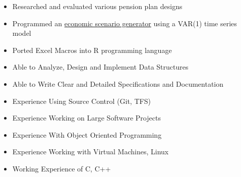 \documentclass[12pt,a4paper]{altacv}
\begin{document}

\divider

\begin{itemize}
\item Researched and evaluated various pension plan designs
\item Programmed an \href{https://github.com/nathanesau/StocVal}{economic scenario generator} using a VAR(1) time series model
\item Ported Excel Macros into R programming language
\end{itemize}

\divider



\begin{itemize}
\item Able to Analyze, Design and Implement Data Structures
\item Able to Write Clear and Detailed Specifications and Documentation
\item Experience Using Source Control (Git, TFS)
\item Experience Working on Large Software Projects
\item Experience With Object Oriented Programming
\item Experience Working with Virtual Machines, Linux
\item Working Experience of C, C++
\end{itemize}
\end{document}

